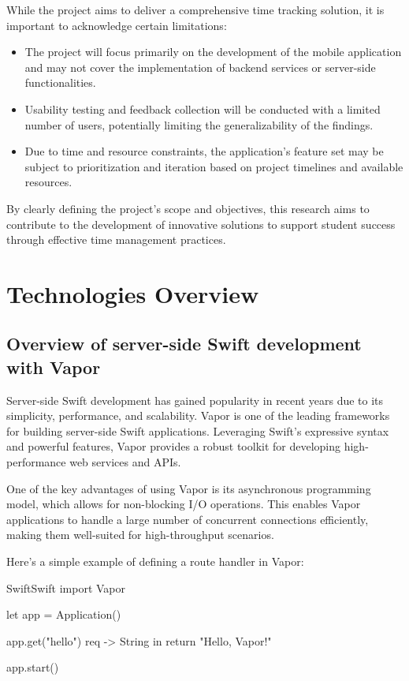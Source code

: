 \documentclass[
  biblatex,
  language=english,
  figures=false,
  sourcecodes,
  glossaries,
  index
]{kidiplom}
\begin{document}
While the project aims to deliver a comprehensive time tracking solution, it is important to acknowledge certain limitations:
\begin{itemize}
    \item The project will focus primarily on the development of the mobile application and may not cover the implementation of backend services or server-side functionalities.
    \item Usability testing and feedback collection will be conducted with a limited number of users, potentially limiting the generalizability of the findings.
    \item Due to time and resource constraints, the application's feature set may be subject to prioritization and iteration based on project timelines and available resources.
\end{itemize}

By clearly defining the project's scope and objectives, this research aims to contribute to the development of innovative solutions to support student success through effective time management practices.


\section{Technologies Overview}

\subsection{Overview of server-side Swift development with Vapor}

Server-side Swift development has gained popularity in recent years due to its simplicity, performance, and scalability. Vapor is one of the leading frameworks for building server-side Swift applications. Leveraging Swift's expressive syntax and powerful features, Vapor provides a robust toolkit for developing high-performance web services and APIs.

One of the key advantages of using Vapor is its asynchronous programming model, which allows for non-blocking I/O operations. This enables Vapor applications to handle a large number of concurrent connections efficiently, making them well-suited for high-throughput scenarios.

Here's a simple example of defining a route handler in Vapor:

\begin{kicode}{Swift}{}{Swift}
import Vapor

let app = Application()

app.get("hello") { req -> String in
    return "Hello, Vapor!"
}

app.start()
\end{kicode}
\end{document}
